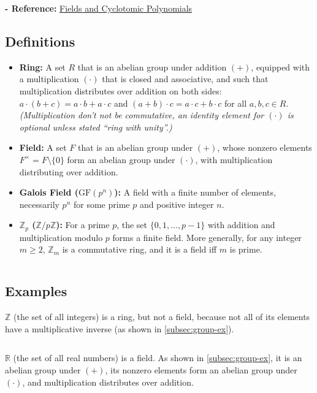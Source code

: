 \textbf{- Reference:} 
\href{https://e.math.cornell.edu/people/belk/numbertheory/CyclotomicPolynomials.pdf}{Fields and Cyclotomic Polynomials}~\cite{cyclotomic-polynomial}

\subsection{Definitions}
\label{subsec:field-def}

\begin{tcolorbox}[title={\textbf{\tboxdef{\ref*{subsec:field-def}} Field Definitions}}]
\begin{itemize}
\item \textbf{Ring:} A set $R$ that is an abelian group under addition $(+)$, equipped with a multiplication $(\cdot)$ that is closed and associative, and such that multiplication distributes over addition on both sides: $a\cdot(b+c)=a\cdot b+a\cdot c$ and $(a+b)\cdot c=a\cdot c+b\cdot c$ for all $a,b,c\in R$. \emph{(Multiplication don't not be commutative, an identity element for $(\cdot)$ is optional unless stated “ring with unity”.)}
\item \textbf{Field:} A set $F$ that is an abelian group under $(+)$, whose nonzero elements $F^\times=F\setminus\{0\}$ form an abelian group under $(\cdot)$, with multiplication distributing over addition.
\item \textbf{Galois Field ($\mathrm{GF}(p^n)$):} A field with a finite number of elements, necessarily $p^n$ for some prime $p$ and positive integer $n$.
\item \textbf{$\mathbb{Z}_p$ ($\mathbb{Z}/p\mathbb{Z}$):} For a prime $p$, the set $\{0,1,\ldots,p-1\}$ with addition and multiplication modulo $p$ forms a finite field. More generally, for any integer $m\ge 2$, $\mathbb{Z}_m$ is a commutative ring, and it is a field iff $m$ is prime.\end{itemize}
\end{tcolorbox}

$ $

\subsection{Examples}
\label{subsec:field-ex}

$\mathbb{Z}$ (the set of all integers) is a ring, but not a field, because not all of its elements have a multiplicative inverse (as shown in \autoref{subsec:group-ex}). 

$ $

\noindent $\mathbb{R}$ (the set of all real numbers) is a field. As shown in \autoref{subsec:group-ex}, it is an abelian group under $(+)$, its nonzero elements form an abelian group under $(\cdot)$, and multiplication distributes over addition.


